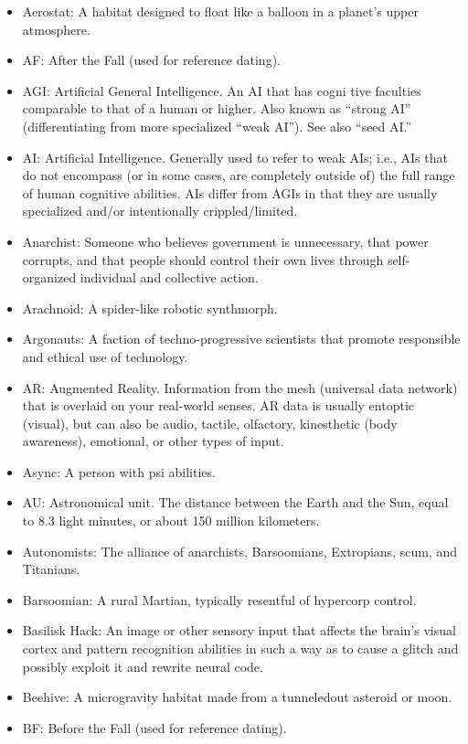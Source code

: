 \begin{itemize}
\item Aerostat: A habitat designed to float like a balloon in a  planet's upper atmosphere.
\item AF: After the Fall (used for reference dating).
\item AGI: Artificial General Intelligence. An AI that has cogni tive  faculties comparable to that of a human or higher. Also known as  ``strong AI'' (differentiating from more specialized ``weak AI''). See  also ``seed AI.''
\item AI: Artificial Intelligence. Generally used to refer to weak  AIs; i.e., AIs that do not encompass (or in some cases, are  completely outside of) the full range of human cognitive  abilities. AIs differ from AGIs in that they are usually specialized  and/or intentionally crippled/limited.
\item Anarchist: Someone who believes government is unnecessary, that  power corrupts, and that people should control their own lives  through self-organized individual and collective action.
\item Arachnoid: A spider-like robotic synthmorph.
\item Argonauts: A faction of techno-progressive scientists that  promote responsible and ethical use of technology.
\item AR: Augmented Reality. Information from the mesh (universal data  network) that is overlaid on your real-world senses. AR data is  usually entoptic (visual), but can also be audio, tactile,  olfactory, kinesthetic (body awareness), emotional, or other types  of input.
\item Async: A person with psi abilities.
\item AU: Astronomical unit. The distance between the Earth and the  Sun, equal to 8.3 light minutes, or about 150 million kilometers.
\item Autonomists: The alliance of anarchists, Barsoomians,  Extropians, scum, and Titanians.
\item Barsoomian: A rural Martian, typically resentful of hypercorp  control.
\item Basilisk Hack: An image or other sensory input that affects the  brain's visual cortex and pattern recognition abilities in such a  way as to cause a glitch and possibly exploit it and rewrite neural  code.
\item Beehive: A microgravity habitat made from a tunneledout asteroid  or moon.
\item BF: Before the Fall (used for reference dating).

\end{itemize}
